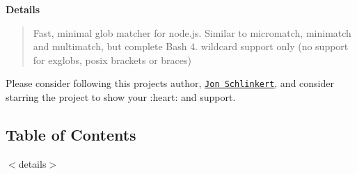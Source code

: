 {\bfseries Details}

\begin{quote}
Fast, minimal glob matcher for node.\+js. Similar to micromatch, minimatch and multimatch, but complete Bash 4. wildcard support only (no support for exglobs, posix brackets or braces) \end{quote}


Please consider following this project\textquotesingle{}s author, \href{https://github.com/jonschlinkert}{\tt Jon Schlinkert}, and consider starring the project to show your \+:heart\+: and support.

\subsection*{Table of Contents}

$<$details$>$



